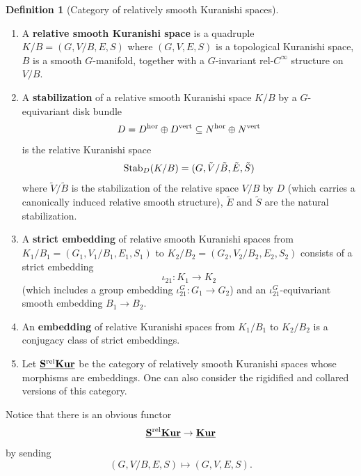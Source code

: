 \documentclass[reqno, 10pt]{amsart}
\numberwithin{equation}{section}
\numberwithin{equation}{section}
\renewcommand{\subset}{\subseteq}
\theoremstyle{definition}
\newtheorem{defn}[thm]{Definition}
\theoremstyle{remark}
\newcommand{\beqn}{\begin{equation*}}
\newcommand{\eeqn}{\end{equation*}}
\newcommand{\uds}[1]{\underline{\smash{#1}}}
\begin{document}
\begin{defn}[Category of relatively smooth Kuranishi spaces] \hfill
\begin{enumerate}

\item A {\bf relative smooth Kuranishi space} is a quadruple $K/B = (G, V/B, E, S)$ where $(G, V, E, S)$ is a topological Kuranishi space, $B$ is a smooth $G$-manifold, together with a $G$-invariant rel-$C^\infty$ structure on $V/B$.

\item A {\bf stabilization} of a relative smooth Kuranishi space $K/B$ by a $G$-equivariant disk bundle
\beqn
D = D^{\rm hor} \oplus D^{\rm vert} \subset N^{\rm hor} \oplus N^{\rm vert}
\eeqn
is the relative Kuranishi space
\beqn
{\rm Stab}_D(K/B) = (G, \tilde V/ \tilde B, \tilde E, \tilde S)
\eeqn
where $\tilde V / \tilde B$ is the stabilization of the relative space $V/B$ by $D$ (which carries a canonically induced relative smooth structure), $\tilde E$ and $\tilde S$ are the natural stabilization. 

\item A {\bf strict embedding} of relative smooth Kuranishi spaces from $K_1/B_1 = (G_1, V_1/B_1, E_1, S_1)$ to $K_2/B_2 = (G_2, V_2/B_2, E_2, S_2)$ consists of a strict embedding 
\beqn
\iota_{21}: K_1 \to K_2
\eeqn
(which includes a group embedding $\iota_{21}^G: G_1 \to G_2$) and an $\iota_{21}^G$-equivariant smooth embedding $B_1 \to B_2$.

\item An {\bf embedding} of relative Kuranishi spaces from $K_1/B_1$ to $K_2/B_2$ is a conjugacy class of strict embeddings. 

\item Let $\uds{\bf S^{\rm rel} Kur}$ be the category of relatively smooth Kuranishi spaces whose morphisms are embeddings. One can also consider the rigidified and collared versions of this category.
\end{enumerate}
\end{defn}

Notice that there is an obvious functor
\beqn
\uds{\bf S^{\rm rel} Kur} \to \uds{\bf Kur}
\eeqn
by sending
\beqn
(G, V/B, E, S) \mapsto (G, V, E, S).
\eeqn
\end{document}
